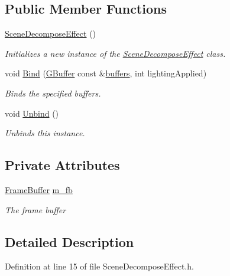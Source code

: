 \subsection*{Public Member Functions}
\begin{DoxyCompactItemize}
\item 
\hyperlink{class_scene_decompose_effect_af2c37b4960d6ccafe8a6c9fe8de6d4e4}{Scene\+Decompose\+Effect} ()
\begin{DoxyCompactList}\small\item\em Initializes a new instance of the \hyperlink{class_scene_decompose_effect}{Scene\+Decompose\+Effect} class. \end{DoxyCompactList}\item 
void \hyperlink{class_scene_decompose_effect_a2c2bbdba7d4a8cbe1988f56b02754118}{Bind} (\hyperlink{class_g_buffer}{G\+Buffer} const \&\hyperlink{_render_manager_a_p_i_8cpp_a3e255706d276f815cf3fbafbbfe660f8}{buffers}, int lighting\+Applied)
\begin{DoxyCompactList}\small\item\em Binds the specified buffers. \end{DoxyCompactList}\item 
void \hyperlink{class_scene_decompose_effect_a92108d282bf0f2d7f3b3889ee64cf77c}{Unbind} ()
\begin{DoxyCompactList}\small\item\em Unbinds this instance. \end{DoxyCompactList}\end{DoxyCompactItemize}
\subsection*{Private Attributes}
\begin{DoxyCompactItemize}
\item 
\hyperlink{class_frame_buffer}{Frame\+Buffer} \hyperlink{class_scene_decompose_effect_a78c46ccb8f4bfd2221c7b69ca80726c9}{m\+\_\+fb}
\begin{DoxyCompactList}\small\item\em The frame buffer \end{DoxyCompactList}\end{DoxyCompactItemize}


\subsection{Detailed Description}


Definition at line 15 of file Scene\+Decompose\+Effect.\+h.



